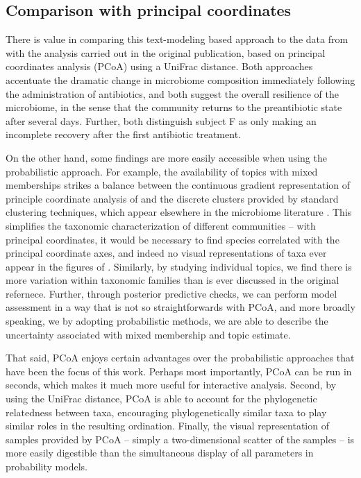 \documentclass[oupdraft]{bio}
\begin{document}
\subsection{Comparison with principal coordinates}
\label{subsec:comparison_with_pcoa}

There is value in comparing this text-modeling based approach to the data from
\citep{dethlefsen2011incomplete} with the analysis carried out in the original
publication, based on principal coordinates analysis (PCoA) using a UniFrac
distance. Both approaches accentuate the dramatic change in microbiome
composition immediately following the administration of antibiotics, and both
suggest the overall resilience of the microbiome, in the sense that the
community returns to the preantibiotic state after several days. Further, both
distinguish subject F as only making an incomplete recovery after the first
antibiotic treatment.

On the other hand, some findings are more easily accessible when using the
probabilistic approach. For example, the availability of topics with mixed
memberships strikes a balance between the continuous gradient representation of
principle coordinate analysis of \citep{dethlefsen2011incomplete} and the
discrete clusters provided by standard clustering techniques, which appear
elsewhere in the microbiome literature \citep{digiulio2015temporal,
  mcmurdie2014waste}. This simplifies the taxonomic characterization of
different communities -- with principal coordinates, it would be necessary to
find species correlated with the principal coordinate axes, and indeed no visual
representations of taxa ever appear in the figures of
\cite{dethlefsen2011incomplete}. Similarly, by studying individual topics, we
find there is more variation within taxonomic families than is ever discussed in
the original refernece. Further, through posterior predictive checks, we can
perform model assessment in a way that is not so straightforwards with PCoA, and
more broadly speaking, we by adopting probabilistic methods, we are able to
describe the uncertainty associated with mixed membership and topic estimate.

That said, PCoA enjoys certain advantages over the probabilistic approaches that
have been the focus of this work. Perhaps most importantly, PCoA can be run in
seconds, which makes it much more useful for interactive analysis. Second, by
using the UniFrac distance, PCoA is able to account for the phylogenetic
relatedness between taxa, encouraging phylogenetically similar taxa to play
similar roles in the resulting ordination. Finally, the visual representation of
samples provided by PCoA -- simply a two-dimensional scatter of the samples --
is more easily digestible than the simultaneous display of all parameters in
probability models.
\end{document}
